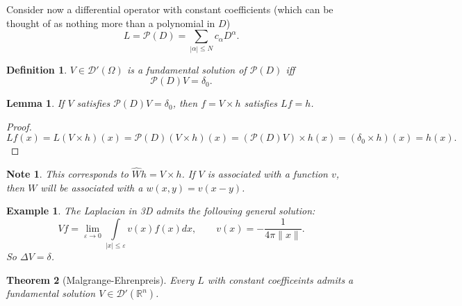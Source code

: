 \documentclass[letterpaper,twoside,11pt]{article}
\theoremstyle{mystyle}
\newtheorem{theorem}{Theorem}[section]
\newtheorem{definition}{Definition}[section]
\newtheorem{lemma}[theorem]{Lemma}
\newtheorem*{ex}{Example}
\newtheorem*{note}{Note}
\newcommand{\R}{{\mathbb R}}
\newcommand{\DD}{\mathcal D}
\begin{document}
Consider now a differential operator with constant coefficients (which can be thought of as  nothing more than a polynomial in $D$)
\[L = \mathcal P(D) = \sum_{|\alpha|\leq N} c_\alpha D^\alpha .\]

\begin{definition}
  $V\in \DD' (\Omega)$ is a fundamental solution of $\mathcal P(D)$ iff 
  \[\mathcal P(D) V = \delta_0.\]
\end{definition}

\begin{lemma}
  If $V$ satisfies $\mathcal P(D) V = \delta_0$, then $f = V\times h$ satisfies $Lf = h$. 
\end{lemma}
\begin{proof}
  \[ Lf(x)  = L\left( V\times h \right) (x) = \mathcal P(D)\left( V\times h \right) (x) = \left( \mathcal P(D) V \right) \times h (x) = \left( \delta_0 \times h \right)(x) = h(x).\] 
\end{proof}
\begin{note}
  This corresponds to $\hat Wh = V\times h$. If $V$ is associated with a function $v$, then $W$ will be associated with a $w(x, y) = v(x-y)$. 
\end{note}
\begin{ex}
  The Laplacian in 3D admits the following general solution: 
  \[Vf = \lim_{\varepsilon \to 0 } \int\limits_{|x|\leq \varepsilon} v(x)f(x)dx, \qquad v(x) = -\frac{1}{4\pi \|x\|}.\]
  So $\Delta V = \delta$. 
\end{ex}

\begin{tcolorbox}[colback=red!5!white,colframe=red!75!black]
\begin{theorem}[Malgrange-Ehrenpreis]
  Every $L$ with constant coefficeints admits a fundamental solution $V \in \DD'\left( \R^n \right)$. 
\end{theorem}
\end{tcolorbox}
\end{document}
